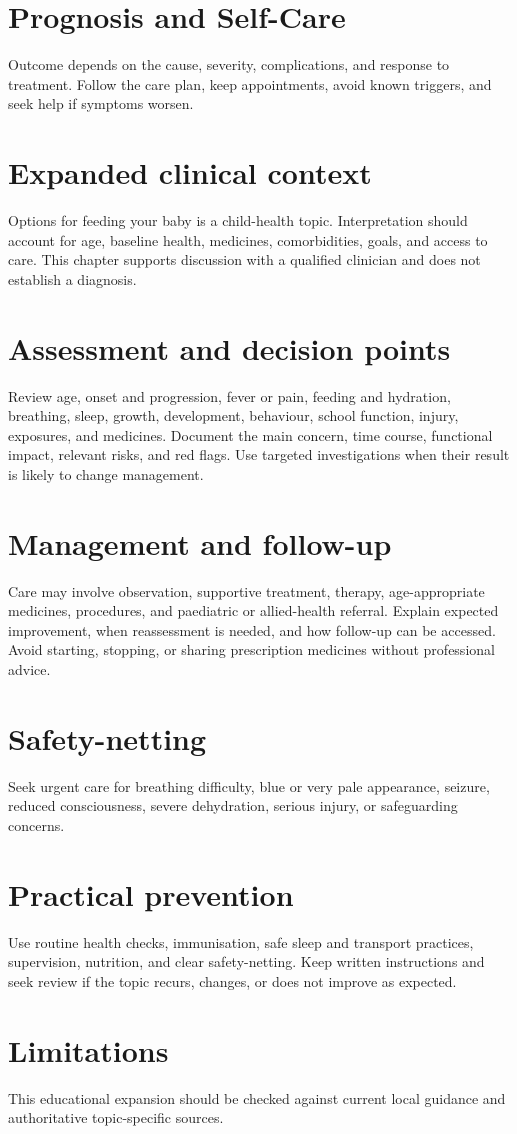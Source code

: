 \section*{Prognosis and Self-Care}
Outcome depends on the cause, severity, complications, and response to treatment. Follow the care plan, keep appointments, avoid known triggers, and seek help if symptoms worsen.

\section*{Expanded clinical context}
Options for feeding your baby is a child-health topic. Interpretation should account for age, baseline health, medicines, comorbidities, goals, and access to care. This chapter supports discussion with a qualified clinician and does not establish a diagnosis.

\section*{Assessment and decision points}
Review age, onset and progression, fever or pain, feeding and hydration, breathing, sleep, growth, development, behaviour, school function, injury, exposures, and medicines. Document the main concern, time course, functional impact, relevant risks, and red flags. Use targeted investigations when their result is likely to change management.

\section*{Management and follow-up}
Care may involve observation, supportive treatment, therapy, age-appropriate medicines, procedures, and paediatric or allied-health referral. Explain expected improvement, when reassessment is needed, and how follow-up can be accessed. Avoid starting, stopping, or sharing prescription medicines without professional advice.

\section*{Safety-netting}
Seek urgent care for breathing difficulty, blue or very pale appearance, seizure, reduced consciousness, severe dehydration, serious injury, or safeguarding concerns.

\section*{Practical prevention}
Use routine health checks, immunisation, safe sleep and transport practices, supervision, nutrition, and clear safety-netting. Keep written instructions and seek review if the topic recurs, changes, or does not improve as expected.

\section*{Limitations}
This educational expansion should be checked against current local guidance and authoritative topic-specific sources.
\clearpage
